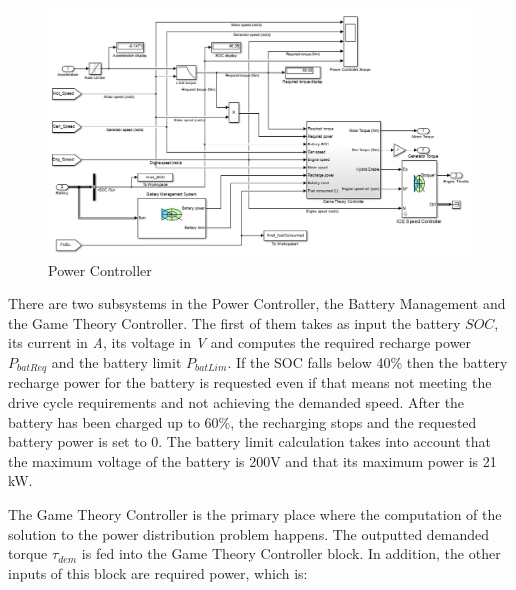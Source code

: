 \begin{figure}[h]
\centering
\includegraphics[scale=0.51]{figures/hev/powercontroller}
\caption{Power Controller}
\label{fig:powercontroller}
\end{figure}

There are two subsystems in the Power Controller, the Battery Management and the Game Theory Controller. The first of them takes as input the battery $SOC$, its current in \textit{A}, its voltage in \textit{V} and computes the required recharge power $P_{batReq}$ and the battery limit $P_{batLim}$. If the SOC falls below 40\% then the battery recharge power for the battery is requested even if that means not meeting the drive cycle requirements and not achieving the demanded speed. After the battery has been charged up to 60\%, the recharging stops and the requested battery power is set to 0. The battery limit calculation takes into account that the maximum voltage of the battery is 200V and that its maximum power is 21 kW.

The Game Theory Controller is the primary place where the computation of the solution to the power distribution problem happens. The outputted demanded torque $\tau_{dem}$ is fed into the Game Theory Controller block. In addition, the other inputs of this block are required power, which is:

